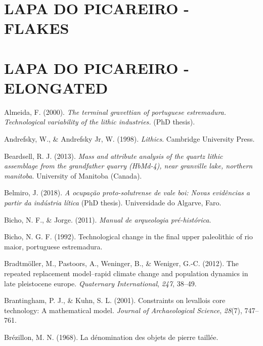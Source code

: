 \documentclass[12pt,twoside]{reedthesis}
\begin{document}
\hypertarget{lapa-do-picareiro---flakes}{%
\section{LAPA DO PICAREIRO - FLAKES}\label{lapa-do-picareiro---flakes}}

\hypertarget{lapa-do-picareiro---elongated}{%
\section{LAPA DO PICAREIRO - ELONGATED}\label{lapa-do-picareiro---elongated}}

\hypertarget{refs}{}
\leavevmode\hypertarget{ref-almeida2000}{}%
Almeida, F. (2000). \emph{The terminal gravettian of portuguese estremadura. Technological variability of the lithic industries.} (PhD thesis).

\leavevmode\hypertarget{ref-andrefsky1998}{}%
Andrefsky, W., \& Andrefsky Jr, W. (1998). \emph{Lithics}. Cambridge University Press.

\leavevmode\hypertarget{ref-beardsell2013}{}%
Beardsell, R. J. (2013). \emph{Mass and attribute analysis of the quartz lithic assemblage from the grandfather quarry (HbMd-4), near granville lake, northern manitoba}. University of Manitoba (Canada).

\leavevmode\hypertarget{ref-belmiro2018}{}%
Belmiro, J. (2018). \emph{A ocupação proto-solutrense de vale boi: Novas evidências a partir da indústria lítica} (PhD thesis). Universidade do Algarve, Faro.

\leavevmode\hypertarget{ref-bicho2011}{}%
Bicho, N. F., \& Jorge. (2011). \emph{Manual de arqueologia pré-histórica}.

\leavevmode\hypertarget{ref-bicho1992}{}%
Bicho, N. G. F. (1992). Technological change in the final upper paleolithic of rio maior, portuguese estremadura.

\leavevmode\hypertarget{ref-bradtmoller2012}{}%
Bradtmöller, M., Pastoors, A., Weninger, B., \& Weniger, G.-C. (2012). The repeated replacement model--rapid climate change and population dynamics in late pleistocene europe. \emph{Quaternary International}, \emph{247}, 38--49.

\leavevmode\hypertarget{ref-brantingham2001}{}%
Brantingham, P. J., \& Kuhn, S. L. (2001). Constraints on levallois core technology: A mathematical model. \emph{Journal of Archaeological Science}, \emph{28}(7), 747--761.

\leavevmode\hypertarget{ref-brezillon1968}{}%
Brézillon, M. N. (1968). La dénomination des objets de pierre taillée.
\end{document}

